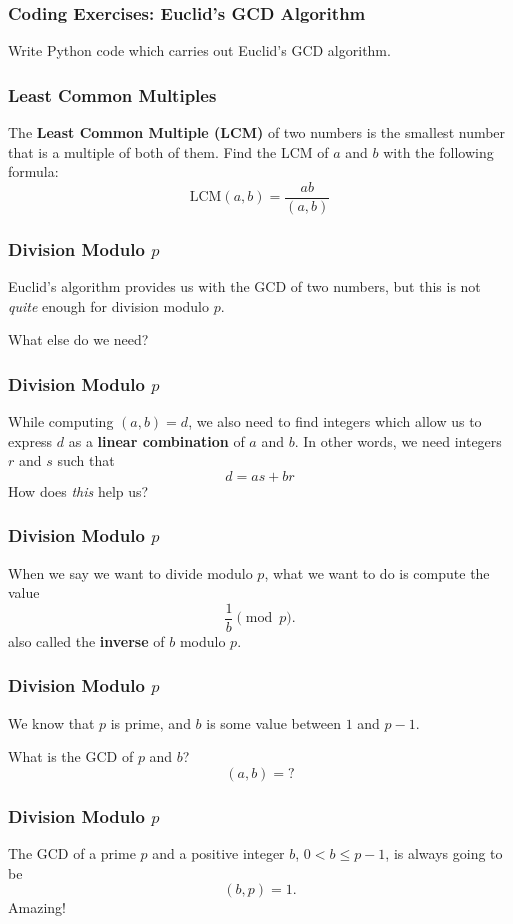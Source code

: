 \documentclass{beamer}
\newcommand{\<}{\langle}
\renewcommand{\>}{\rangle}
\begin{document}
\begin{frame}
\frametitle{Coding Exercises: Euclid's GCD Algorithm}

Write Python code which carries out Euclid's GCD algorithm. 
\end{frame}


\begin{frame}
\frametitle{Least Common Multiples}

The \textbf{Least Common Multiple (LCM)} of two numbers is the smallest number that is a multiple of both of them. Find the LCM of $a$ and $b$ with the following formula:
\[
\mathrm{LCM}(a,b) = \frac{ab}{(a,b)}
\]
\end{frame}


\begin{frame}
\frametitle{Division Modulo $p$}

Euclid's algorithm provides us with the GCD of two numbers, but this is not \emph{quite} enough for division modulo $p$. \newline

What else do we need?
\end{frame}


\begin{frame}
\frametitle{Division Modulo $p$}

While computing $(a,b) = d$, we also need to find integers which allow us to express $d$ as a \textbf{linear combination} of $a$ and $b$. In other words, we need integers $r$ and $s$ such that 
\[
d = as + br
\]
How does \emph{this} help us?
\end{frame}

\begin{frame}
\frametitle{Division Modulo $p$}

When we say we want to divide modulo $p$, what we want to do is compute the value 
\[
\frac{1}{b}  \pmod p.
\]
also called the \textbf{inverse} of $b$ modulo $p$. 
\end{frame}


\begin{frame}
\frametitle{Division Modulo $p$}

We know that $p$ is prime, and $b$ is some value between $1$ and $p-1$.\newline

What is the GCD of $p$ and $b$?
\[
(a,b) = ?
\]
\end{frame}

\begin{frame}
\frametitle{Division Modulo $p$}

The GCD of a prime $p$ and a positive integer $b$, $0<b\le p-1$, is always going to be
\[
(b,p) = 1.
\]
Amazing!
\end{frame}
\end{document}
